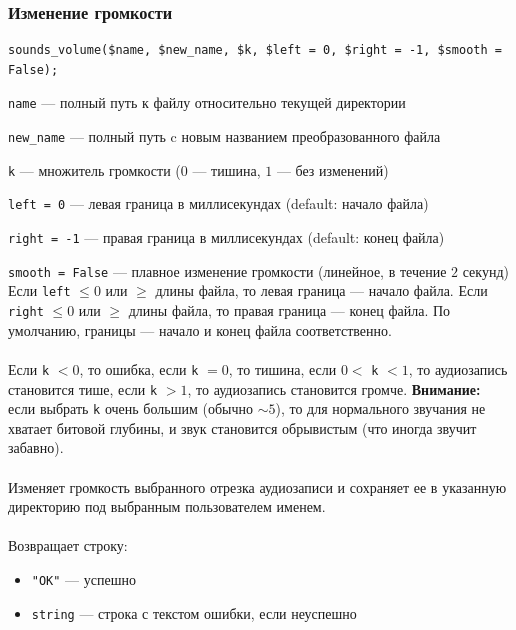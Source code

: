 \documentclass[14pt,a4paper]{article}
\begin{document}
\subsubsection*{Изменение громкости}

\begin{lstlisting}
sounds_volume($name, $new_name, $k, $left = 0, $right = -1, $smooth = False);
\end{lstlisting}

\lstinline{name} --- полный путь к файлу относительно текущей директории \par
\lstinline{new_name} --- полный путь c новым названием преобразованного файла \par
\lstinline{k} --- множитель громкости ($0$ --- тишина, $1$ --- без изменений)\par
\lstinline{left = 0} --- левая граница в миллисекундах (default: начало файла) \par
\lstinline{right = -1} --- правая граница в миллисекундах (default: конец файла) \par
\lstinline{smooth = False} --- плавное изменение громкости (линейное, в течение $2$ секунд) \\

\noindent Если \lstinline{left} $\leq 0$ или $\geq$ длины файла, то левая граница --- начало файла. Если \lstinline{right} $\leq 0$ или $\geq$ длины файла, то правая граница --- конец файла. По умолчанию, границы --- начало и конец файла соответственно. \\\\
Если \lstinline{k} $< 0$, то ошибка, если \lstinline{k} $= 0$, то тишина, если $0 <$ \lstinline{k} $< 1$, то аудиозапись становится тише, если \lstinline{k} $> 1$, то аудиозапись становится громче. \textbf{Внимание:} если выбрать \lstinline{k} очень большим (обычно $\sim 5$), то для нормального звучания не хватает битовой глубины, и звук становится обрывистым (что иногда звучит забавно).\\\\
Изменяет громкость выбранного отрезка аудиозаписи и сохраняет ее в указанную директорию под выбранным пользователем именем. \\\\
Возвращает строку:
\smallskip
\begin{itemize}
\item \lstinline{"OK"} --- успешно
\item \lstinline{string} --- строка с текстом ошибки, если неуспешно
\end{itemize}
\end{document}
